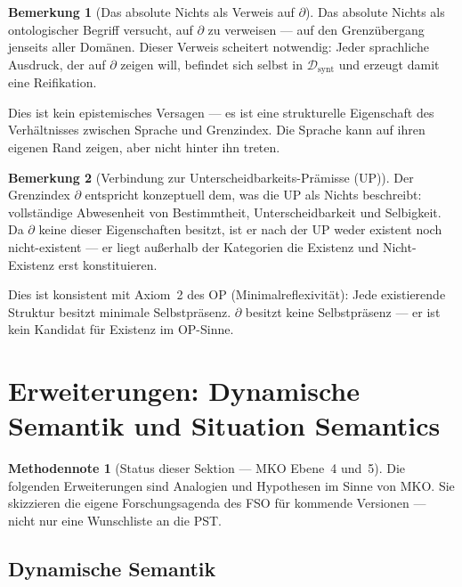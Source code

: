 \documentclass[11pt,a4paper]{article}
\theoremstyle{plain}
\theoremstyle{definition}
\newtheorem{remark}{Bemerkung}[section]
\newtheorem{methodennote}{Methodennote}[section]
\begin{document}
\begin{remark}[Das absolute Nichts als Verweis auf $\partial$]
Das absolute Nichts als ontologischer Begriff versucht, auf $\partial$ zu verweisen
--- auf den Grenz\"{u}bergang jenseits aller Dom\"{a}nen. Dieser Verweis scheitert
notwendig: Jeder sprachliche Ausdruck, der auf $\partial$ zeigen will, befindet sich
selbst in $\mathcal{D}_{\mathrm{synt}}$ und erzeugt damit eine Reifikation.

Dies ist kein epistemisches Versagen --- es ist eine strukturelle Eigenschaft des
Verh\"{a}ltnisses zwischen Sprache und Grenzindex. Die Sprache kann auf ihren eigenen
Rand zeigen, aber nicht hinter ihn treten.
\end{remark}

\begin{remark}[Verbindung zur Unterscheidbarkeits-Pr\"{a}misse (UP)]
Der Grenzindex $\partial$ entspricht konzeptuell dem, was die UP als
\glqq{}Nichts\grqq{} beschreibt: vollst\"{a}ndige Abwesenheit von Bestimmtheit,
Unterscheidbarkeit und Selbigkeit. Da $\partial$ keine dieser Eigenschaften besitzt,
ist er nach der UP weder existent noch nicht-existent --- er liegt au\ss{}erhalb der
Kategorien die Existenz und Nicht-Existenz erst konstituieren.

Dies ist konsistent mit Axiom~2 des OP (Minimalreflexivit\"{a}t): Jede existierende
Struktur besitzt minimale Selbstpr\"{a}senz. $\partial$ besitzt keine Selbstpr\"{a}senz
--- er ist kein Kandidat f\"{u}r Existenz im OP-Sinne.
\end{remark}

\section{Erweiterungen: Dynamische Semantik und Situation Semantics}

\begin{methodennote}[Status dieser Sektion --- MKO Ebene~4 und~5]
Die folgenden Erweiterungen sind Analogien und Hypothesen im Sinne von MKO. Sie
skizzieren die eigene Forschungsagenda des FSO f\"{u}r kommende Versionen ---
nicht nur eine Wunschliste an die PST.
\end{methodennote}

\subsection{Dynamische Semantik}
\end{document}
